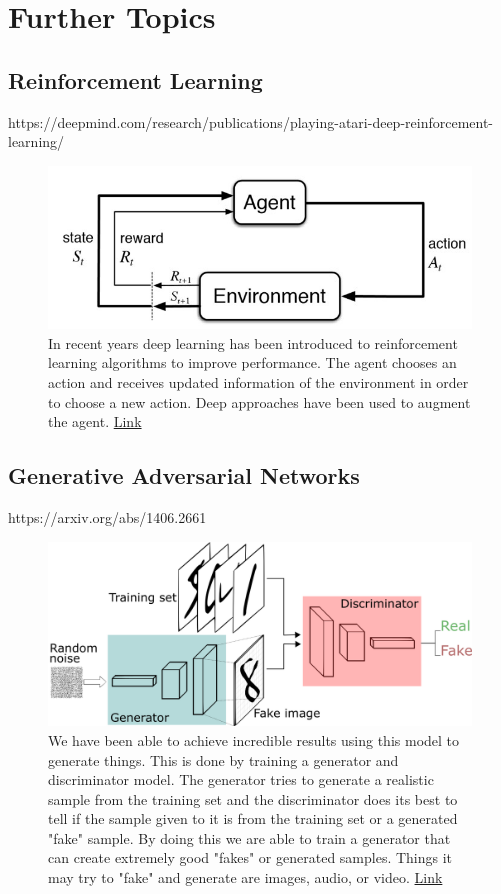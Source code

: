 \documentclass{article}
\begin{document}
\newpage
\section{Further Topics}

\subsection{Reinforcement Learning}
https://deepmind.com/research/publications/playing-atari-deep-reinforcement-learning/
\begin{figure}[H]
    \centering
    \includegraphics[width=4.5in]{rl.jpg}
    \caption{In recent years deep learning has been introduced to reinforcement learning algorithms to improve performance. The agent chooses an action and receives updated information of the environment in order to choose a new action. Deep approaches have been used to augment the agent. \href{https://www.kdnuggets.com/2018/03/5-things-reinforcement-learning.html}{Link}}
    \label{fig:rl}
\end{figure}

\subsection{Generative Adversarial Networks}
https://arxiv.org/abs/1406.2661
\begin{figure}[H]
    \centering
    \includegraphics[width=4.5in]{gans.png}
    \caption{We have been able to achieve incredible results using this model to generate things. This is done by training a generator and discriminator model. The generator tries to generate a realistic sample from the training set and the discriminator does its best to tell if the sample given to it is from the training set or a generated "fake" sample. By doing this we are able to train a generator that can create extremely good "fakes" or generated samples. Things it may try to "fake" and generate are images, audio, or video. \href{https://skymind.ai/wiki/generative-adversarial-network-gan}{Link}}
    \label{fig:rl}
\end{figure}
\end{document}
